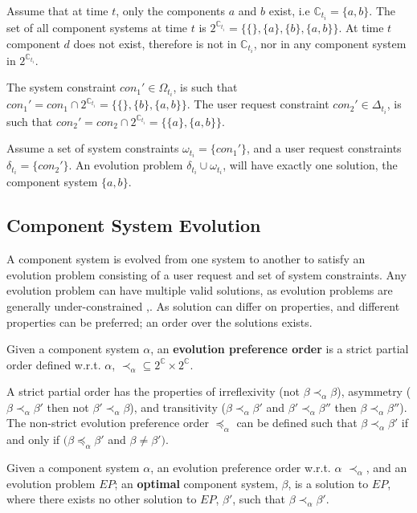 Assume that at time $t$, only the components $a$ and $b$ exist, i.e $\mathbb{C}_{t_i} = \{a,b\}$.
The set of all component systems at time $t$ is $2^{\mathbb{C}_{t_i}} = \{\{\},\{a\},\{b\},\{a,b\}\}$.
At time $t$ component $d$ does not exist, therefore is not in $\mathbb{C}_{t_i}$, nor in any component system in $2^{\mathbb{C}_{t_i}}$.

The system constraint $con_1' \in \Omega_{t_i}$, is such that $con_1' = con_1 \cap 2^{\mathbb{C}_{t_i}} = \{\{\},\{b\},\{a,b\}\}$.
The user request constraint $con_2' \in \Delta_{t_i}$, is such that $con_2' = con_2 \cap 2^{\mathbb{C}_{t_i}} = \{\{a\},\{a,b\}\}$.

Assume a set of system constraints $\omega_{t_i} = \{con_1'\}$, and a user request constraints $\delta_{t_i} = \{con_2'\}$.
An evolution problem $\delta_{t_i} \cup \omega_{t_i}$, will have exactly one solution, the component system $\{a,b\}$.  

\subsection{Component System Evolution}
\label{formal.evo}
A component system is evolved from one system to another to satisfy an evolution problem consisting of a user request and set of system constraints.
Any evolution problem can have multiple valid solutions, as evolution problems are generally under-constrained \citep{Berre2008},.
As solution can differ on properties, and different properties can be preferred; an order over the solutions exists.  

\begin{defs}
Given a component system $\alpha$, an \textbf{evolution preference order} is a strict partial order defined w.r.t. $\alpha$,  $\prec_{\alpha} \subseteq 2^{\mathbb{C}} \times 2^{\mathbb{C}}$.
\end{defs}
A strict partial order has the properties of irreflexivity (not $\beta \prec_{\alpha} \beta$), asymmetry ($\beta \prec_{\alpha} \beta'$ then not $\beta' \prec_{\alpha} \beta$), 
and transitivity ($\beta \prec_{\alpha} \beta'$ and $\beta' \prec_{\alpha} \beta''$ then $\beta \prec_{\alpha} \beta''$).
The non-strict evolution preference order $\preceq_{\alpha}$ can be defined such that $\beta \prec_{\alpha} \beta'$ if and only if $(\beta \preceq_{\alpha} \beta'$ and $\beta \neq \beta')$. 

\begin{defs}
Given a component system $\alpha$, an evolution preference order w.r.t. $\alpha$ $\prec_{\alpha}$, and an evolution problem $EP$;
an \textbf{optimal} component system, $\beta$, is a solution to $EP$, where there exists no other solution to $EP$, $\beta'$, such that $\beta \prec_{\alpha} \beta'$.   
\end{defs}

